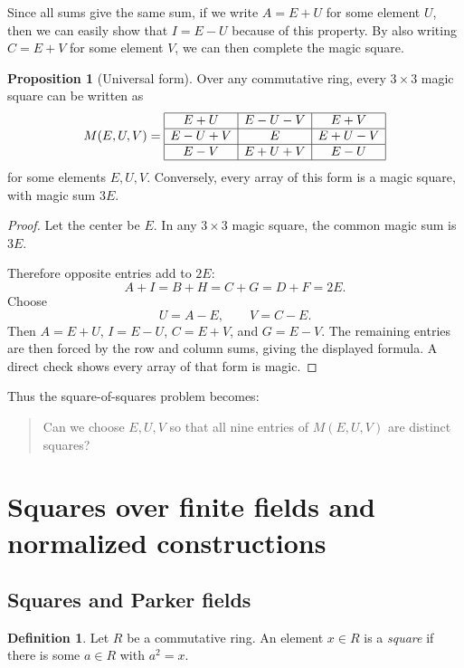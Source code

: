 \documentclass{article}
\theoremstyle{definition}
\newtheorem{proposition}{Proposition}
\newtheorem*{definition}{Definition}
\numberwithin{equation}{section}
\begin{document}
Since all sums give the same sum, if we write \(A=E+U\) for some element \(U\), then we can easily show that $I=E-U$ because of this property. By also writing \(C=E+V\) for some element \(V\), we can then complete the magic square.

\begin{proposition}[Universal form]
Over any commutative ring, every \(3\times3\) magic square can be written as
\[
M(E,U,V)=
\begin{array}{|c|c|c|}
\hline
E+U & E-U-V & E+V\\
\hline
E-U+V & E & E+U-V\\
\hline
E-V & E+U+V & E-U\\
\hline
\end{array}
\]
for some elements \(E,U,V\). Conversely, every array of this form is a magic
square, with magic sum \(3E\).
\end{proposition}

\begin{proof}
Let the center be \(E\). In any \(3\times3\) magic square, the common magic sum
is \(3E\).

Therefore opposite entries add to \(2E\):
\[
A+I=B+H=C+G=D+F=2E.
\]
Choose
\[
U=A-E,\qquad V=C-E.
\]
Then \(A=E+U\), \(I=E-U\), \(C=E+V\), and \(G=E-V\). The remaining entries are
then forced by the row and column sums, giving the displayed formula. A direct
check shows every array of that form is magic.
\end{proof}

Thus the square-of-squares problem becomes:

\begin{quote}
Can we choose \(E,U,V\) so that all nine entries of \(M(E,U,V)\) are distinct
squares?
\end{quote}

\section{Squares over finite fields and normalized constructions}
\label{sec:finite-field-preliminaries}

\subsection{Squares and Parker fields}

\begin{definition}
Let \(R\) be a commutative ring. An element \(x\in R\) is a \emph{square} if
there is some \(a\in R\) with \(a^2=x\).
\end{definition}
\end{document}
